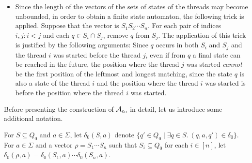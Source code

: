 \begin{itemize}
%
%
	\item Since the length of the vectors of the sets of states of the threads may become unbounded, in order to obtain a finite state automaton, the following trick is applied.
    Suppose that the vector is $S_1 S_2 \cdots S_n$.
    For each pair of indices $i, j: i < j$ and each $q \in S_i \cap S_j$, remove $q$ from $S_j$.
    The application of this trick is justified by the following arguments: Since $q$ occurs in both $S_i$ and $S_j$ and the thread $i$ was started before the thread $j$, even if from $q$  a final state can be reached in the future, the position where the thread $j$ was started \emph{cannot} be the first position of the leftmost and longest matching, since the state $q$ is also a state of the thread $i$ and the position where the thread $i$ was started is before the position where the thread $i$ was started.
\end{itemize}

Before presenting the construction of $\mathcal{A}_{e_0}$ in detail, let us introduce some additional notation.

For $S \subseteq Q_0$ and $a \in \Sigma$, let $\delta_0(S,a)$ denote $\{q' \in Q_0 \mid \exists q \in S.\ (q,a,q') \in \delta_0 \}$. For $a \in \Sigma$ and a vector $\rho = S_1 \cdots S_n$ such that $S_i \subseteq Q_0$ for each $i \in [n]$, let $\delta_0(\rho,a)=\delta_0(S_1,a) \cdots \delta_0(S_n, a)$.


